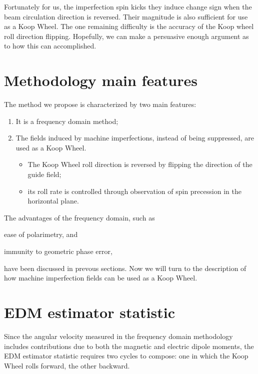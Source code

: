 \documentclass[a4paper]{jacow}
\begin{document}
Fortunately for us, the imperfection spin kicks they induce change sign when the beam circulation direction
is reversed. Their magnitude is also sufficient for use as a Koop Wheel. The one remaining difficulty
is the accuracy of the Koop wheel roll direction flipping. Hopefully, we can make a persuasive
enough argument as to how this can accomplished.

\section{Methodology main features}

The method we propose is characterized by two main features:
\begin{enumerate}
\item It is a frequency domain method;
\item The fields induced by machine imperfections, instead of being suppressed,
  are used as a Koop Wheel.
  \begin{itemize}
  \item The Koop Wheel roll direction is reversed by flipping the direction of the guide field;
  \item its roll rate is controlled through observation of spin precession in the horizontal plane.
  \end{itemize}
\end{enumerate}

The advantages of the frequency domain, such as
\begin{inparaenum}
\item ease of polarimetry, and
\item immunity to geometric phase error,
\end{inparaenum}
have been discussed in prevous sections. Now we will turn to the description of how machine imperfection fields
can be used as a Koop Wheel.

\section{EDM estimator statistic}
Since the angular velocity measured in the frequency domain methodology includes contributions due to both the
magnetic and electric dipole moments, the EDM estimator statistic requires two cycles to compose:
one in which the Koop Wheel rolls forward, the other backward.
\end{document}
